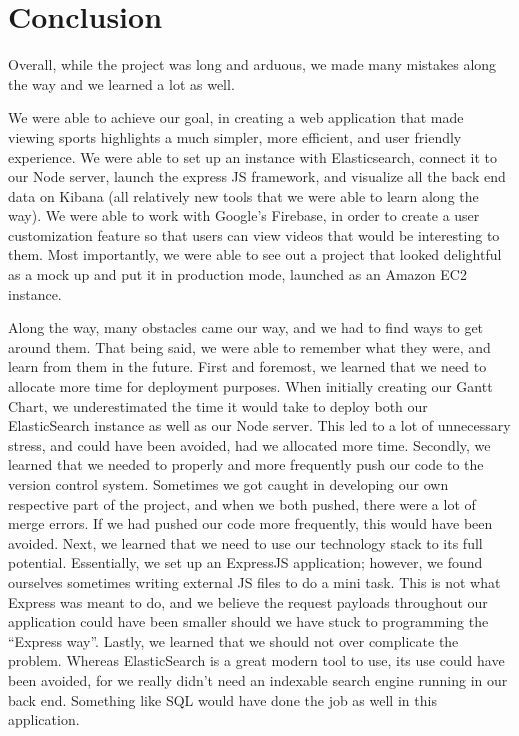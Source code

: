 \chapter{Conclusion}

\par Overall, while the project was long and arduous,  we made many mistakes along the way and we learned a lot as well. 

\par We were able to achieve our goal, in creating a web application that made viewing sports highlights a much simpler, more efficient, and user friendly experience. We were able to set up an instance with Elasticsearch, connect it to our Node server, launch the express JS framework, and visualize all the back end data on Kibana (all relatively new tools that we were able to learn along the way). We were able to work with Google’s Firebase, in order to create a user customization feature so that users can view videos that would be interesting to them. Most importantly, we were able to see out a project that looked delightful as a mock up and put it in production mode, launched as an Amazon EC2 instance. 

\par Along the way, many obstacles came our way, and we had to find ways to get around them. That being said, we were able to remember what they were, and learn from them in the future. First and foremost, we learned that we need to allocate more time for deployment purposes. When initially creating our Gantt Chart, we underestimated the time it would take to deploy both our ElasticSearch instance as well as our Node server. This led to a lot of unnecessary stress, and could have been avoided, had we allocated more time. Secondly, we learned that we needed to properly and more frequently push our code to the version control system. Sometimes we got caught in developing our own respective part of the project, and when we both pushed, there were a lot of merge errors. If we had pushed our code more frequently, this would have been avoided. Next, we learned that we need to use our technology stack to its full potential. Essentially, we set up an ExpressJS application; however, we found ourselves sometimes writing external JS files to do a mini task. This is not what Express was meant to do, and we believe the request payloads throughout our application could have been smaller should we have stuck to programming the “Express way”. Lastly, we learned that we should not over complicate the problem. Whereas ElasticSearch is a great modern tool to use, its use could have been avoided, for we really didn’t need an indexable search engine running in our back end. Something like SQL would have done the job as well in this application. 

